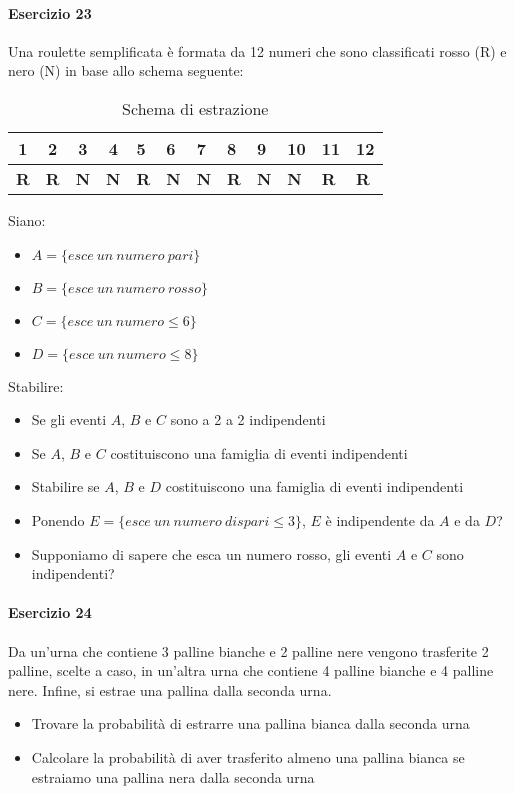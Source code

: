 \documentclass[12pt]{article}
\begin{document}
    \paragraph{Esercizio 23}
    Una roulette semplificata è formata da 12 numeri che sono classificati rosso (R) e nero (N) in base allo schema seguente:
    \begin{table}[htb]
        \centering
        \begin{tabular}{ccccllllllll}
        \hline
        1          & 2          & 3          & 4          & 5          & 6          & 7          & 8          & 9          & 10         & 11         & 12         \\ \hline
        \textbf{R} & \textbf{R} & \textbf{N} & \textbf{N} & \textbf{R} & \textbf{N} & \textbf{N} & \textbf{R} & \textbf{N} & \textbf{N} & \textbf{R} & \textbf{R} \\ \hline
        \end{tabular}
        \caption{Schema di estrazione}
        \label{tab:my-table}
    \end{table}
    Siano:
    \begin{itemize}
        \item $A = \{esce \ un \ numero \ pari\}$
        \item $B = \{esce \ un \ numero \ rosso\}$
        \item $C = \{esce \ un \ numero \leq 6\}$
        \item $D = \{esce \ un \ numero \leq 8\}$
    \end{itemize}
    \FloatBarrier
    Stabilire:
    \begin{itemize}
        \item Se gli eventi $A$, $B$ e $C$ sono a 2 a 2 indipendenti
        \item Se $A$, $B$ e $C$ costituiscono una famiglia di eventi indipendenti
        \item Stabilire se $A$, $B$ e $D$ costituiscono una famiglia di eventi indipendenti
        \item Ponendo $E = \{esce \ un \ numero \ dispari \leq 3\}$, $E$ è indipendente da $A$ e da $D$?
        \item Supponiamo di sapere che esca un numero rosso, gli eventi $A$ e $C$ sono indipendenti?
    \end{itemize}
    \paragraph{Esercizio 24}
    Da un’urna che contiene 3 palline bianche e 2 palline nere vengono trasferite 2 palline, scelte a caso, in un’altra urna che contiene 4 palline bianche e 4 palline nere. Infine, si estrae una pallina dalla seconda urna.
    \begin{itemize}
        \item Trovare la probabilità di estrarre una pallina bianca dalla seconda urna
        \item Calcolare la probabilità di aver trasferito almeno una pallina bianca se estraiamo una pallina nera dalla seconda urna
    \end{itemize}
    \newpage
\end{document}
